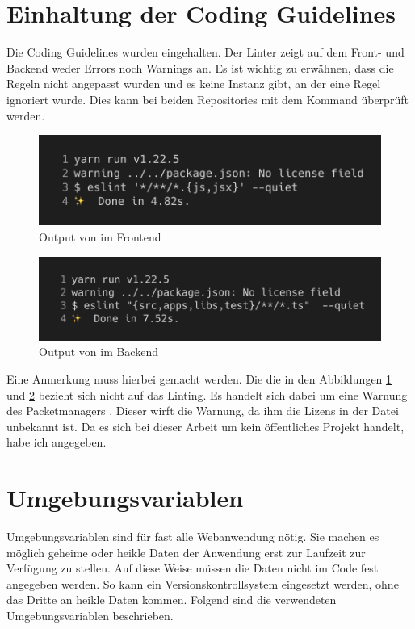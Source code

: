 \section{Einhaltung der Coding Guidelines}
Die Coding Guidelines wurden eingehalten. Der Linter zeigt auf dem Front- und Backend weder Errors noch Warnings an. Es ist wichtig zu erwähnen, dass die Regeln nicht angepasst wurden und es keine Instanz gibt, an der eine Regel ignoriert wurde.
\newline
Dies kann bei beiden Repositories mit dem Kommand  überprüft werden.
\begin{figure}[H]
  \centering
  \includegraphics[width=.7\linewidth]{./images/linting-frontend.png}
  \caption[{Output von  im Frontend}]{Output von  im Frontend}
  \label{fig:lint-frnt}
\end{figure}
\begin{figure}[H]
  \centering
  \includegraphics[width=.7\linewidth]{./images/linting-backend.png}
  \caption[{Output von  im Backend}]{Output von  im Backend}
  \label{fig:lint-bck}
\end{figure}
Eine Anmerkung muss hierbei gemacht werden. Die  die in den Abbildungen \ref{fig:lint-frnt} und \ref{fig:lint-bck} bezieht sich nicht auf das Linting. Es handelt sich dabei um eine Warnung des Packetmanagers . Dieser wirft die Warnung, da ihm die Lizens in der Datei  unbekannt ist. Da es sich bei dieser Arbeit um kein öffentliches Projekt handelt, habe ich  angegeben.
\section{Umgebungsvariablen}
Umgebungsvariablen sind für fast alle Webanwendung nötig. Sie machen es möglich geheime oder heikle Daten der Anwendung erst zur Laufzeit zur Verfügung zu stellen. Auf diese Weise müssen die Daten nicht im Code fest angegeben werden. So kann ein Versionskontrollsystem eingesetzt werden, ohne das Dritte an heikle Daten kommen. Folgend sind die verwendeten Umgebungsvariablen beschrieben.
